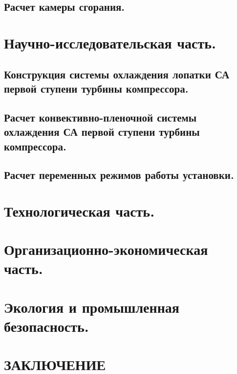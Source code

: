 \documentclass[a4paper,12pt]{article}
\begin{document}
    \subsection{Расчет камеры сгорания.}

    \section{Научно-исследовательская часть.}
    \subsection{Конструкция системы охлаждения лопатки СА первой ступени турбины компрессора.}
    \subsection{Расчет конвективно-пленочной системы охлаждения СА первой ступени турбины компрессора.}
    \subsection{Расчет переменных режимов работы установки.}

    \section{Технологическая часть.}
    \section{Организационно-экономическая часть.}
    \section{Экология и промышленная безопасность.}

    \section{ЗАКЛЮЧЕНИЕ}
\end{document}
